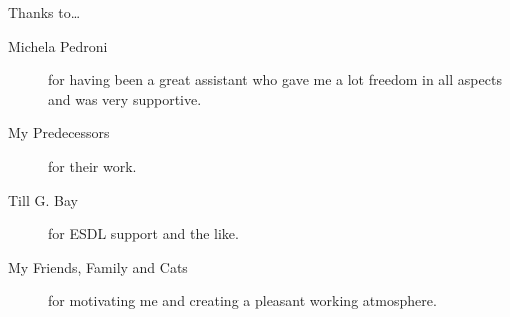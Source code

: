 Thanks to\ldots

  \begin{description}
    \item[Michela Pedroni]
      for having been a great assistant who gave me a lot freedom in all aspects and was very supportive.
      
    \item[My Predecessors]
      for their work.

    \item[Till G. Bay]
      for ESDL support and the like.
      
    \item[My Friends, Family and Cats]
      for motivating me and creating a pleasant working atmosphere.
  \end{description}
      

